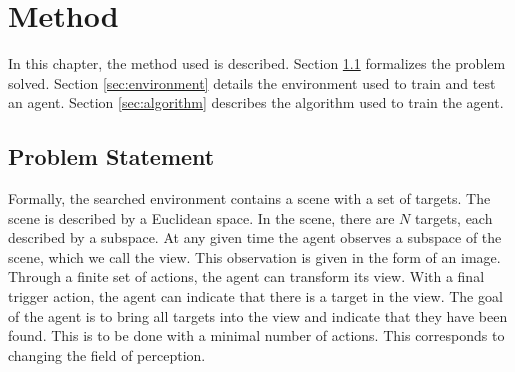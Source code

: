 \chapter{Method}
\label{cha:method}

% 

In this chapter, the method used is described.
Section \ref{sec:problem} formalizes the problem solved.
Section \ref{sec:environment} details the environment used to train and test an agent.
Section \ref{sec:algorithm} describes the algorithm used to train the agent.

\section{Problem Statement}
\label{sec:problem}



Formally, the searched environment contains a scene with a set of targets.
The scene is described by a Euclidean space.
In the scene, there are \(N\) targets, each described by a subspace.
At any given time the agent observes a subspace of the scene, which we call the view.
This observation is given in the form of an image.
Through a finite set of actions, the agent can transform its view.
With a final trigger action, the agent can indicate that there is a target in the view.
The goal of the agent is to bring all targets into the view and indicate that they have been found.
This is to be done with a minimal number of actions.
This corresponds to changing the field of perception.


